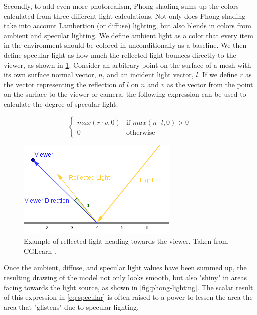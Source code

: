 \documentclass[10pt,twocolumn,letterpaper]{article}
\begin{document}
Secondly, to add even more photorealism, Phong shading sums up the colors calculated from three different light calculations. Not only does Phong shading take into account Lambertion (or diffuse) lighting, but also blends in colors from ambient and specular lighting. We define ambient light as a color that every item in the environment should be colored in unconditionally as a baseline. We then define specular light as how much the reflected light bounces directly to the viewer, as shown in \cref{fig:phong-angles}. Consider an arbitrary point on the surface of a mesh with its own surface normal vector, $n$, and an incident light vector, $l$. If we define $r$ as the vector representing the reflection of $l$ on $n$ and $v$ as the vector from the point on the surface to the viewer or camera, the following expression can be used to calculate the degree of specular light:

\begin{equation}
    \begin{cases}
         max(r \cdot v, 0) &\text{if } max(n \cdot l, 0) > 0\\
         0 &\text{otherwise}
    \end{cases}
    \label{eq:specular}
\end{equation}

\begin{figure}[t]
  \centering
  \includegraphics[width=0.65\linewidth]{angles1.png}

   \caption{Example of reflected light heading towards the viewer. Taken from CGLearn \cite{cglearn}.}
   \label{fig:phong-angles}
\end{figure}

Once the ambient, diffuse, and specular light values have been summed up, the resulting drawing of the model not only looks smooth, but also "shiny" in areas facing towards the light source, as shown in \cref{fig:phong-lighting}. The scalar result of this expression in \cref{eq:specular} is often raised to a power to lessen the area the area that "glistens" due to specular lighting.
\end{document}
